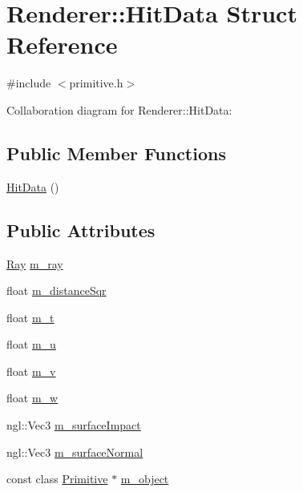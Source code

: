 \hypertarget{structRenderer_1_1HitData}{}\section{Renderer\+:\+:Hit\+Data Struct Reference}
\label{structRenderer_1_1HitData}


{\ttfamily \#include $<$primitive.\+h$>$}



Collaboration diagram for Renderer\+:\+:Hit\+Data\+:
\subsection*{Public Member Functions}
\begin{DoxyCompactItemize}
\item 
\hyperlink{structRenderer_1_1HitData_a68c0ee0efbd32d15c3fd9add42eb8f8a}{Hit\+Data} ()
\end{DoxyCompactItemize}
\subsection*{Public Attributes}
\begin{DoxyCompactItemize}
\item 
\hyperlink{structRenderer_1_1Ray}{Ray} \hyperlink{structRenderer_1_1HitData_a5aee6d1129c216194f0b0bfbbb3d6e55}{m\+\_\+ray}
\item 
float \hyperlink{structRenderer_1_1HitData_a51f1e587ef8b56abfd1f3017aa24584b}{m\+\_\+distance\+Sqr}
\item 
float \hyperlink{structRenderer_1_1HitData_adeafe63956b601b01d7ea69bde1a1986}{m\+\_\+t}
\item 
float \hyperlink{structRenderer_1_1HitData_ac70ab126082944359393e5bb0cd5abb2}{m\+\_\+u}
\item 
float \hyperlink{structRenderer_1_1HitData_a025e748b1c3e95f989128cf6c3b8f5c8}{m\+\_\+v}
\item 
float \hyperlink{structRenderer_1_1HitData_a9d85ba822c1cc07983e5c00e457178d9}{m\+\_\+w}
\item 
ngl\+::\+Vec3 \hyperlink{structRenderer_1_1HitData_a21db1ed6df74b8b6c7109025928201c6}{m\+\_\+surface\+Impact}
\item 
ngl\+::\+Vec3 \hyperlink{structRenderer_1_1HitData_a12c4d926e3b5d93a8e12d65e36139760}{m\+\_\+surface\+Normal}
\item 
const class \hyperlink{classRenderer_1_1Primitive}{Primitive} $\ast$ \hyperlink{structRenderer_1_1HitData_a68a87eb8a21afc9cb328fc242153ae09}{m\+\_\+object}
\end{DoxyCompactItemize}


